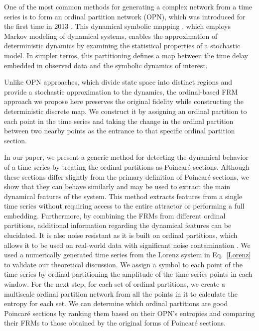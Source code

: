 \documentclass[%
 aip,
 amsmath,amssymb,
 reprint,%
]{revtex4-1}
\begin{document}
One of the most common methods for generating a complex network from a time series is to form an ordinal partition network (OPN), which was introduced for the first time in 2013 \cite{r16}. 
This dynamical symbolic mapping \cite{r23}, which employs Markov modeling of dynamical systems, enables the approximation of deterministic dynamics by examining the statistical properties of a stochastic model. 
In simpler terms, this partitioning defines a map between the time delay embedded in observed data and the symbolic dynamics of interest. %

Unlike OPN approaches, which divide state space into distinct regions and provide a stochastic approximation to the dynamics, the ordinal-based FRM approach we propose here preserves the original fidelity while constructing the deterministic discrete map.
We construct it by assigning an ordinal partition to each point in the time series and taking the change in the ordinal partition between two nearby points as the entrance to that specific ordinal partition section.

In our paper, we present a generic method for detecting the dynamical behavior of a time series by treating the ordinal partitions as Poincar\'e sections. Although these sections differ slightly from the primary definition of Poincar\'e sections, we show that they can behave similarly and may be used to extract the main dynamical features of the system. This method extracts features from a single time series without requiring access to the entire attractor or performing a full embedding.
Furthermore, by combining the FRMs from different ordinal partitions, additional information regarding the dynamical features can be elucidated. It is also noise resistant as it is built on ordinal partitions, which allows it to be used on real-world data with significant noise contamination \cite{r12}.
We used a numerically generated time series from the Lorenz system in Eq.~\ref{Lorenz} to validate our theoretical discussion.  We assign a symbol to each point of the time series by ordinal partitioning the amplitude of the time series points in each window. For the next step, for each set of ordinal partitions, we create a multiscale ordinal partition network from all the points in it to calculate the entropy for each set. We can determine which ordinal partitions are good Poincar\'e sections by ranking them based on their OPN's entropies and comparing their FRMs to those obtained by the original forms of Poincar\'e sections.
\end{document}
